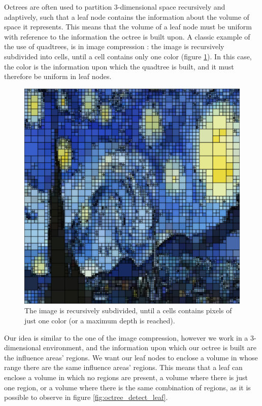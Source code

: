 \documentclass{PoliMi_MasterThesis}
\begin{document}
Octrees are often used to partition 3-dimensional space recursively and adaptively, such that a leaf node contains the information about the volume of space it represents. This means that the volume of a leaf node must be uniform with reference to the information the octree is built upon. A classic example of the use of quadtrees, is in image compression \cite{image_compression_quadtree}: the image is recursively subdivided into cells, until a cell contains only one color (figure \ref{fig:quadtree_for_compression}). In this case, the color is the information upon which the quadtree is built, and it must therefore be uniform in leaf nodes.

\begin{figure}[H]
	\centering
	\includegraphics[width=\textwidth*\real{0.65}]{Images/quadtree_for_compression.png}
	\caption{The image is recursively subdivided, until a cells contains pixels of just one color (or a maximum depth is reached).}
	\label{fig:quadtree_for_compression}
\end{figure}

Our idea is similar to the one of the image compression, however we work in a 3-dimensional environment, and the information upon which our octree is built are the influence areas' regions. We want our leaf nodes to enclose a volume in whose range there are the same influence areas' regions. This means that a leaf can enclose a volume in which no regions are present, a volume where there is just one region, or a volume where there is the same combination of regions, as it is possible to observe in figure \ref{fig:octree_detect_leaf}.
\end{document}
